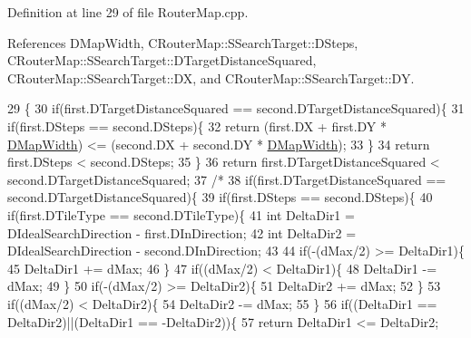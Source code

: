 Definition at line 29 of file Router\+Map.\+cpp.



References D\+Map\+Width, C\+Router\+Map\+::\+S\+Search\+Target\+::\+D\+Steps, C\+Router\+Map\+::\+S\+Search\+Target\+::\+D\+Target\+Distance\+Squared, C\+Router\+Map\+::\+S\+Search\+Target\+::\+DX, and C\+Router\+Map\+::\+S\+Search\+Target\+::\+DY.


\begin{DoxyCode}
29                                                                                            \{
30     \textcolor{keywordflow}{if}(first.DTargetDistanceSquared == second.DTargetDistanceSquared)\{
31         \textcolor{keywordflow}{if}(first.DSteps == second.DSteps)\{
32             \textcolor{keywordflow}{return} (first.DX + first.DY * \hyperlink{classCRouterMap_a9899b7a017d376a16af153f6f91159d3}{DMapWidth}) <= (second.DX + second.DY * 
      \hyperlink{classCRouterMap_a9899b7a017d376a16af153f6f91159d3}{DMapWidth});
33         \}
34         \textcolor{keywordflow}{return} first.DSteps < second.DSteps;
35     \}
36     \textcolor{keywordflow}{return} first.DTargetDistanceSquared < second.DTargetDistanceSquared;
37 \textcolor{comment}{/*    }
38 \textcolor{comment}{    if(first.DTargetDistanceSquared == second.DTargetDistanceSquared)\{}
39 \textcolor{comment}{        if(first.DSteps == second.DSteps)\{}
40 \textcolor{comment}{            if(first.DTileType == second.DTileType)\{}
41 \textcolor{comment}{                int DeltaDir1 = DIdealSearchDirection - first.DInDirection;}
42 \textcolor{comment}{                int DeltaDir2 = DIdealSearchDirection - second.DInDirection;}
43 \textcolor{comment}{                }
44 \textcolor{comment}{                if(-(dMax/2) >= DeltaDir1)\{}
45 \textcolor{comment}{                    DeltaDir1 += dMax;   }
46 \textcolor{comment}{                \}}
47 \textcolor{comment}{                if((dMax/2) < DeltaDir1)\{}
48 \textcolor{comment}{                    DeltaDir1 -= dMax;   }
49 \textcolor{comment}{                \}}
50 \textcolor{comment}{                if(-(dMax/2) >= DeltaDir2)\{}
51 \textcolor{comment}{                    DeltaDir2 += dMax;   }
52 \textcolor{comment}{                \}}
53 \textcolor{comment}{                if((dMax/2) < DeltaDir2)\{}
54 \textcolor{comment}{                    DeltaDir2 -= dMax;   }
55 \textcolor{comment}{                \}}
56 \textcolor{comment}{                if((DeltaDir1 == DeltaDir2)||(DeltaDir1 == -DeltaDir2))\{}
57 \textcolor{comment}{                    return DeltaDir1 <= DeltaDir2;    }

\end{DoxyCode}
